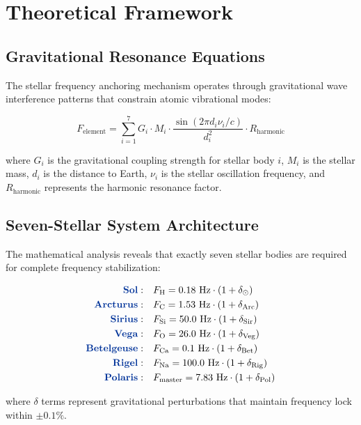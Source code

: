 \documentclass[
    reprint,
    amsmath,amssymb,
    aps,
    prl,
    groupedaddress,
    showpacs,
    superscriptaddress
]{revtex4-2}
\newcommand{\stellar}[1]{\textcolor{stellarblue}{\textbf{#1}}}
\begin{document}
\section{Theoretical Framework}

\subsection{Gravitational Resonance Equations}
The stellar frequency anchoring mechanism operates through gravitational wave interference patterns that constrain atomic vibrational modes:

\begin{equation}
F_{\text{element}} = \sum_{i=1}^{7} G_i \cdot M_i \cdot \frac{\sin(2\pi d_i \nu_i / c)}{d_i^2} \cdot R_{\text{harmonic}}
\end{equation}

where $G_i$ is the gravitational coupling strength for stellar body $i$, $M_i$ is the stellar mass, $d_i$ is the distance to Earth, $\nu_i$ is the stellar oscillation frequency, and $R_{\text{harmonic}}$ represents the harmonic resonance factor.

\subsection{Seven-Stellar System Architecture}
The mathematical analysis reveals that exactly seven stellar bodies are required for complete frequency stabilization:

\begin{align}
\stellar{Sol}: &\quad F_{\text{H}} = 0.18 \text{ Hz} \cdot (1 + \delta_{\odot}) \\
\stellar{Arcturus}: &\quad F_{\text{C}} = 1.53 \text{ Hz} \cdot (1 + \delta_{\text{Arc}}) \\
\stellar{Sirius}: &\quad F_{\text{Si}} = 50.0 \text{ Hz} \cdot (1 + \delta_{\text{Sir}}) \\
\stellar{Vega}: &\quad F_{\text{O}} = 26.0 \text{ Hz} \cdot (1 + \delta_{\text{Veg}}) \\
\stellar{Betelgeuse}: &\quad F_{\text{Ca}} = 0.1 \text{ Hz} \cdot (1 + \delta_{\text{Bet}}) \\
\stellar{Rigel}: &\quad F_{\text{Na}} = 100.0 \text{ Hz} \cdot (1 + \delta_{\text{Rig}}) \\
\stellar{Polaris}: &\quad F_{\text{master}} = 7.83 \text{ Hz} \cdot (1 + \delta_{\text{Pol}})
\end{align}

where $\delta$ terms represent gravitational perturbations that maintain frequency lock within $\pm 0.1\%$.
\end{document}
